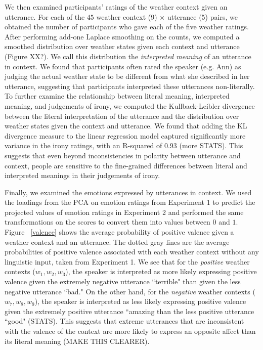 \documentclass[10pt,letterpaper]{article}
\begin{document}
We then examined participants' ratings of the weather context given an utterance. For each of the $45$ weather context (9) $\times$ utterance (5) pairs, we obtained the number of participants who gave each of the five weather ratings. After performing add-one Laplace smoothing on the counts, we computed a smoothed distribution over weather states given each context and utterance (Figure XX?). We call this distribution the \emph{interpreted meaning} of an utterance in context. We found that participants often rated the speaker (e.g. Ann) as judging the actual weather state to be different from what she described in her utterance, suggesting that participants interpreted these utterances non-literally. To further examine the relationship between literal meaning, interpreted meaning, and judgements of irony, we computed the Kullback-Leibler divergence between the literal interpretation of the utterance and the distribution over weather states given the context and utterance. 
We found that adding the KL divergence measure to the linear regression model captured significantly more variance in the irony ratings, with an R-squared of 0.93 (more STATS). 
This suggests that even beyond inconsistencies in polarity between utterance and context, people are sensitive to the fine-grained differences between literal and interpreted meanings in their judgements of irony.

Finally, we examined the emotions expressed by utterances in context. We used the loadings from the PCA on emotion ratings from Experiment 1 to predict the projected values of emotion ratings in Experiment 2 and performed the same transformations on the scores to convert them into values between $0$ and $1$. Figure ~\ref{valence} shows the average probability of positive valence given a weather context and an utterance. The dotted gray lines are the average probabilities of positive valence associated with each weather context without any linguistic input, taken from Experiment 1. We see that for the \emph{positive} weather contexts ($w_1, w_2, w_3$), the speaker is interpreted as more likely expressing positive valence given the extremely negative utterance ``terrible" than given the less negative utterance ``bad." On the other hand, for the \emph{negative} weather contexts ($w_7, w_8, w_9$), the speaker is interpreted as less likely expressing positive valence given the extremely positive utterance ``amazing than the less positive utterance ``good" (STATS). This suggests that extreme utterances that are inconsistent with the valence of the context are more likely to express an opposite affect than its literal meaning (MAKE THIS CLEARER).
\end{document}
